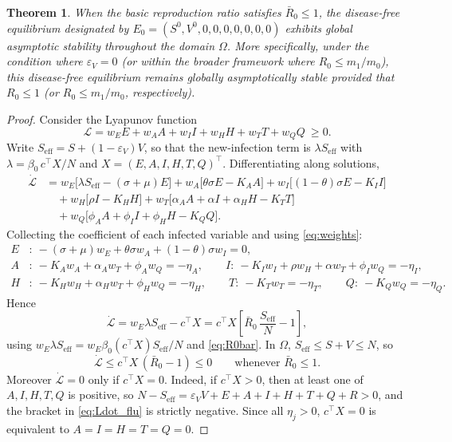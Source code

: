 \documentclass[12pt,a4paper]{article}
\newtheorem{theorem}{Theorem}[section]
\theoremstyle{definition}
\theoremstyle{remark}
\begin{document}
\begin{theorem}\label{thm:GAS_flu}
When the basic reproduction ratio satisfies $\bar R_0\le 1$, the disease-free equilibrium designated by $E_0=(S^0,V^0,0,0,0,0,0,0,0)$ exhibits global asymptotic stability throughout the domain $\Omega$. More specifically, under the condition where $\varepsilon_V=0$ (or within the broader framework where $R_0\le m_1/m_0$), this disease-free equilibrium remains globally asymptotically stable provided that $R_0\le 1$ (or $R_0\le m_1/m_0$, respectively).
\end{theorem}

\begin{proof}
Consider the Lyapunov function
\[
\mathcal L=w_EE+w_AA+w_II+w_HH+w_TT+w_QQ\ \ge0 .
\]
Write $S_{\mathrm{eff}}=S+(1-\varepsilon_V)V$, so that the new-infection term is
$\lambda S_{\mathrm{eff}}$ with $\lambda=\beta_0\,c^\top X/N$ and $X=(E,A,I,H,T,Q)^\top$.
Differentiating along solutions,
\[
\begin{aligned}
\dot{\mathcal L}
&=w_E\bigl[\lambda S_{\mathrm{eff}}-(\sigma+\mu)E\bigr]
+w_A\bigl[\theta\sigma E-K_AA\bigr]
+w_I\bigl[(1-\theta)\sigma E-K_II\bigr]\\
&\quad+w_H\bigl[\rho I-K_HH\bigr]
+w_T\bigl[\alpha_AA+\alpha I+\alpha_HH-K_TT\bigr]\\
&\quad+w_Q\bigl[\phi_AA+\phi_II+\phi_HH-K_QQ\bigr].
\end{aligned}
\]
Collecting the coefficient of each infected variable and using
\eqref{eq:weights}:
\[
\begin{aligned}
E&:\ -(\sigma+\mu)w_E+\theta\sigma w_A+(1-\theta)\sigma w_I=0,\\
A&:\ -K_Aw_A+\alpha_Aw_T+\phi_Aw_Q=-\eta_A,\qquad
I:\ -K_Iw_I+\rho w_H+\alpha w_T+\phi_Iw_Q=-\eta_I,\\
H&:\ -K_Hw_H+\alpha_Hw_T+\phi_Hw_Q=-\eta_H,\qquad
T:\ -K_Tw_T=-\eta_T,\qquad Q:\ -K_Qw_Q=-\eta_Q .
\end{aligned}
\]
Hence
\begin{equation}\label{eq:Ldot_flu}
\dot{\mathcal L}=w_E\lambda S_{\mathrm{eff}}-c^\top X
=c^\top X\left[\bar R_0\,\frac{S_{\mathrm{eff}}}{N}-1\right],
\end{equation}
using $w_E\lambda S_{\mathrm{eff}}=w_E\beta_0(c^\top X)S_{\mathrm{eff}}/N$ and
\eqref{eq:R0bar}. In $\Omega$, $S_{\mathrm{eff}}\le S+V\le N$, so
\[
\dot{\mathcal L}\le c^\top X\,(\bar R_0-1)\le0\qquad\text{whenever }\bar R_0\le1 .
\]
Moreover $\dot{\mathcal L}=0$ only if $c^\top X=0$. Indeed, if $c^\top X>0$, then
at least one of $A,I,H,T,Q$ is positive, so
$N-S_{\mathrm{eff}}=\varepsilon_VV+E+A+I+H+T+Q+R>0$, and the bracket in
\eqref{eq:Ldot_flu} is strictly negative. Since all $\eta_j>0$,
$c^\top X=0$ is equivalent to $A=I=H=T=Q=0$.


\end{proof}
\end{document}
